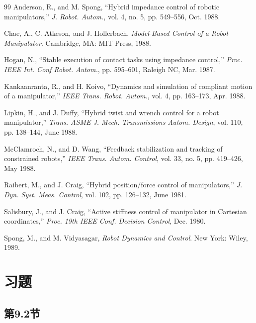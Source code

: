 \documentclass[12pt,a4paper]{ctexart}
\begin{document}
\begin{thebibliography}{99}
 Anderson, R., and M. Spong, ``Hybrid impedance control of robotic manipulators,'' \textit{J. Robot. Autom.}, vol. 4, no. 5, pp. 549--556, Oct. 1988.

 Chae, A., C. Atkeson, and J. Hollerbach, \textit{Model-Based Control of a Robot Manipulator}. Cambridge, MA: MIT Press, 1988.

 Hogan, N., ``Stable execution of contact tasks using impedance control,'' \textit{Proc. IEEE Int. Conf Robot. Autom.}, pp. 595--601, Raleigh NC, Mar. 1987.

 Kankaanranta, R., and H. Koivo, ``Dynamics and simulation of compliant motion of a manipulator,'' \textit{IEEE Trans. Robot. Autom.}, vol. 4, pp. 163--173, Apr. 1988.

 Lipkin, H., and J. Duffy, ``Hybrid twist and wrench control for a robot manipulator,'' \textit{Trans. ASME J. Mech. Transmissions Autom. Design}, vol. 110, pp. 138--144, June 1988.

 McClamroch, N., and D. Wang, ``Feedback stabilization and tracking of constrained robots,'' \textit{IEEE Trans. Autom. Control}, vol. 33, no. 5, pp. 419--426, May 1988.

 Raibert, M., and J. Craig, ``Hybrid position/force control of manipulators,'' \textit{J. Dyn. Syst. Meas. Control}, vol. 102, pp. 126--132, June 1981.

 Salisbury, J., and J. Craig, ``Active stiffness control of manipulator in Cartesian coordinates,'' \textit{Proc. 19th IEEE Conf. Decision Control}, Dec. 1980.

 Spong, M., and M. Vidyasagar, \textit{Robot Dynamics and Control}. New York: Wiley, 1989.
\end{thebibliography}

\section*{习题}

\subsection*{第9.2节}
\end{document}
